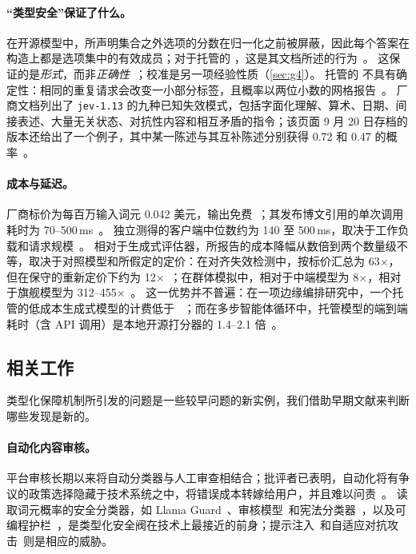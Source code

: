 \paragraph{“类型安全”保证了什么。}
在开源模型中，所声明集合之外选项的分数在归一化之前被屏蔽，因此每个答案在构造上都是选项集中的有效成员；对于托管的 \jev{}，这是其文档所述的行为~\cite{arx26758,typesafe_intro}。
这保证的是\emph{形式}，而非\emph{正确性}~\cite{arx26758}；校准是另一项经验性质（\cref{sec:g4}）。
托管的 \jev{} 不具有确定性：相同的重复请求会改变一小部分标签，且概率以两位小数的网格报告~\cite{arx32160,arx01006}。
厂商文档列出了 \texttt{jev-1.13} 的九种已知失效模式，包括字面化理解、算术、日期、间接表述、大量无关状态、对抗性内容和相互矛盾的指令；该页面 9 月 20 日存档的版本还给出了一个例子，其中某一陈述与其互补陈述分别获得 0.72 和 0.47 的概率~\cite{typesafe_jaggedness}。

\paragraph{成本与延迟。}
厂商标价为每百万输入词元 0.042 美元，输出免费~\cite{typesafe_models}；其发布博文引用的单次调用耗时为 70--500\,ms~\cite{almeida2026introducing}。
独立测得的客户端中位数约为 140 至 500\,ms，取决于工作负载和请求规模~\cite{arx26550,arx27535,arx28919,arx22753,arx23136,arx27331,arx00346}。
相对于生成式评估器，所报告的成本降幅从数倍到两个数量级不等，取决于对照模型和所假定的定价：在对齐失效检测中，按标价汇总为 63$\times$，但在保守的重新定价下约为 12$\times$~\cite{arx29429}；在群体模拟中，相对于中端模型为 8$\times$，相对于旗舰模型为 312--455$\times$~\cite{arx27535}。
这一优势并不普遍：在一项边缘编排研究中，一个托管的低成本生成式模型的计费低于 \jev{}~\cite{arx23136}；而在多步智能体循环中，托管模型的端到端耗时（含 API 调用）是本地开源打分器的 1.4--2.1 倍~\cite{arx00437}。



\subsection{相关工作}
\label{sec:related}

类型化保障机制所引发的问题是一些较早问题的新实例，我们借助早期文献来判断哪些发现是新的。

\paragraph{自动化内容审核。}
平台审核长期以来将自动分类器与人工审查相结合；批评者已表明，自动化将有争议的政策选择隐藏于技术系统之中，将错误成本转嫁给用户，并且难以问责~\cite{gorwa2020algorithmic,gillespie2018custodians}。
读取词元概率的安全分类器，如 Llama Guard~\cite{inan2023llama}、审核模型~\cite{markov2023holistic}和宪法分类器~\cite{sharma2025constitutional}，以及可编程护栏~\cite{rebedea2023nemo}，是类型化安全阀在技术上最接近的前身；提示注入~\cite{perez2022ignore,greshake2023not,zhan2024injecagent}和自适应对抗攻击~\cite{zou2023universal,toyer2024tensor}则是相应的威胁。

